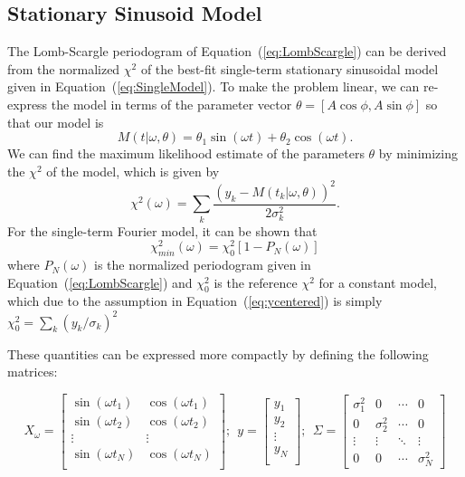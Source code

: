 \documentclass[12pt,preprint]{aastex}
\newcommand{\Eq}[1]{Equation~(\ref{eq:#1})}
\newcommand{\eq}[1]{\Eq{#1}}
\newcommand{\eqlabel}[1]{\label{eq:#1}}
\begin{document}
\subsection{Stationary Sinusoid Model}
The Lomb-Scargle periodogram of \eq{LombScargle} can be derived from the normalized $\chi^2$ of the best-fit single-term stationary sinusoidal model given in \eq{SingleModel}. To make the problem linear, we can re-express the model in terms of the parameter vector $\theta = [A\cos\phi, A\sin\phi]$ so that our model is
\begin{equation}
  \eqlabel{simplemodel}
  M(t|\omega,\theta) = \theta_1\sin(\omega t) + \theta_2\cos(\omega t).
\end{equation}
We can find the maximum likelihood estimate of the parameters $\theta$ by minimizing the $\chi^2$ of the model, which is given by
\begin{equation}
  \chi^2(\omega) = \sum_k \frac{(y_k - M(t_k|\omega,\theta))^2}{2\sigma_k^2}.
\end{equation}
For the single-term Fourier model, it can be shown \citep[See, e.g.][]{ICVG2014} that
\begin{equation}
  \eqlabel{chi2PN}
  \chi_{min}^2(\omega) = \chi^2_0[1 - P_N(\omega)]
\end{equation}
where $P_N(\omega)$ is the normalized periodogram given in \eq{LombScargle} and $\chi^2_0$ is the reference $\chi^2$ for a constant model, which due to the assumption in \eq{ycentered} is simply $\chi^2_0 = \sum_k (y_k/\sigma_k)^2$

These quantities can be expressed more compactly by defining the following matrices:

\begin{equation}
X_\omega = \left[
\begin{array}{cc}
\sin(\omega t_1) & \cos(\omega t_1)\\
\sin(\omega t_2) & \cos(\omega t_2)\\
\vdots & \vdots \\
\sin(\omega t_N) & \cos(\omega t_N)\\
\end{array}
\right];~~
y = \left[
\begin{array}{c}
y_1 \\
y_2\\
\vdots \\
y_N\\
\end{array}
\right];~~
\Sigma = \left[
\begin{array}{cccc}
\sigma_1^2 & 0 &  \cdots & 0\\
0 & \sigma_2^2 &  \cdots & 0\\
\vdots & \vdots &  \ddots & \vdots\\
0 & 0 &  \cdots & \sigma_N^2
\end{array}
\right]
\end{equation}
\end{document}
